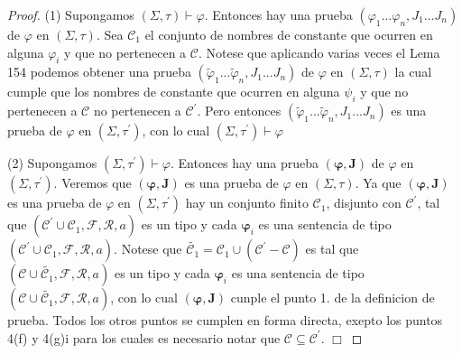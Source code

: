   \begin{proof}
    (1) Supongamos \((\Sigma ,\tau )\vdash \varphi \). Entonces hay una prueba \( (\varphi _{1}...\varphi _{n},J_{1}...J_{n})\) de \(\varphi \) en \((\Sigma ,\tau )\). Sea \(\mathcal{C}_{1}\) el conjunto de nombres de constante que ocurren en alguna \(\varphi _{i}\) y que no pertenecen a \(\mathcal{C}.\) Notese que aplicando varias veces el Lema 154 podemos obtener una prueba \( (\tilde{\varphi}_{1}...\tilde{\varphi}_{n},J_{1}...J_{n})\) de \(\varphi \) en \( (\Sigma ,\tau )\) la cual cumple que los nombres de constante que ocurren en alguna \(\psi _{i}\) y que no pertenecen a \(\mathcal{C}\) no pertenecen a \( \mathcal{C}^{\prime }\). Pero entonces \((\tilde{\varphi}_{1}...\tilde{\varphi} _{n},J_{1}...J_{n})\) es una prueba de \(\varphi \) en \((\Sigma ,\tau ^{\prime })\), con lo cual \((\Sigma ,\tau ^{\prime })\vdash \varphi \)

    (2) Supongamos \((\Sigma ,\tau ^{\prime })\vdash \varphi \). Entonces hay una prueba \((\mathbf{\varphi },\mathbf{J})\) de \(\varphi \) en \((\Sigma ,\tau ^{\prime })\). Veremos que \((\mathbf{\varphi },\mathbf{J})\) es una prueba de \( \varphi \) en \((\Sigma ,\tau )\). Ya que \((\mathbf{\varphi },\mathbf{J})\) es una prueba de \(\varphi \) en \((\Sigma ,\tau ^{\prime })\) hay un conjunto finito \(\mathcal{C}_{1}\), disjunto con \(\mathcal{C}^{\prime }\), tal que \(( \mathcal{C}^{\prime }\cup \mathcal{C}_{1},\mathcal{F},\mathcal{R},a)\) es un tipo y cada \(\mathbf{\varphi }_{i}\) es una sentencia de tipo \((\mathcal{C} ^{\prime }\cup \mathcal{C}_{1},\mathcal{F},\mathcal{R},a)\). Notese que \( \widetilde{\mathcal{C}_{1}}=\mathcal{C}_{1}\cup (\mathcal{C}^{\prime }- \mathcal{C})\) es tal que \((\mathcal{C}\cup \widetilde{\mathcal{C}_{1}}, \mathcal{F},\mathcal{R},a)\) es un tipo y cada \(\mathbf{\varphi }_{i}\) es una sentencia de tipo \((\mathcal{C}\cup \widetilde{\mathcal{C}_{1}},\mathcal{F}, \mathcal{R},a)\), con lo cual \((\mathbf{\varphi },\mathbf{J})\) cunple el punto 1. de la definicion de prueba. Todos los otros puntos se cumplen en forma directa, exepto los puntos 4(f) y 4(g)i para los cuales es necesario notar que \(\mathcal{C}\subseteq \mathcal{C}^{\prime }\). \(\Box\)
  \end{proof}

